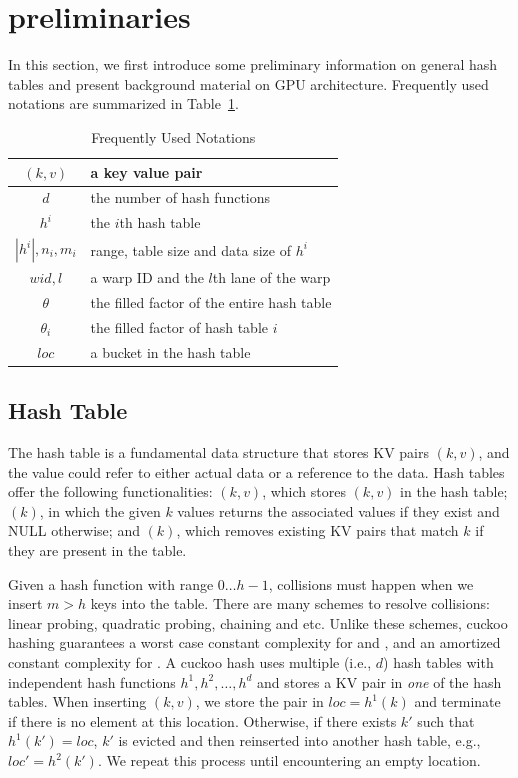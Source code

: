 \section{preliminaries}\label{sec:pre}
In this section, we first introduce some preliminary information on general hash tables and  present background material on GPU architecture. Frequently used notations are summarized in Table~\ref{tbl:stat:datasets}.

\begin{table}
	\centering
	\caption{Frequently Used Notations}
	\vspace{-1em}
	\label{tbl:stat:datasets}
	\begin{tabular}{|c|l|}
		\hline
		$(k,v)$ & a key value pair \\ \hline
		$d$		& the number of hash functions \\ \hline
		$h^i$	& the $i$th hash table \\ \hline
		$|h^i|,n_i,m_i$	& range, table size and data size of $h^i$ \\ \hline
		$wid,l$	& a warp ID and the $l$th lane of the warp \\ \hline
		$\theta$& the filled factor of the entire hash table \\ \hline
		$\theta_i$& the filled factor of hash table $i$ \\ \hline
		$loc$	& a bucket in the hash table \\ \hline
	\end{tabular}
\end{table}

\subsection{Hash Table}
The hash table is a fundamental data structure that stores KV pairs $(k,v)$, and the value could refer to either actual data or a reference to the data.
Hash tables offer the following functionalities: $(k,v)$, which stores $(k,v)$ in the hash table; $(k)$, in which the given $k$ values returns the associated values if they exist and NULL otherwise; and $(k)$, which removes existing KV pairs that match $k$ if they are present in the table.

Given a hash function with range $0 \ldots h-1$, collisions must happen when we insert $m>h$ keys into the table. There are many schemes to resolve collisions: linear probing, quadratic probing, chaining and etc. Unlike these schemes, cuckoo hashing \cite{pagh2004cuckoo} guarantees a worst case constant complexity for  and ,  and an amortized constant complexity for . A cuckoo hash uses multiple (i.e., $d$) hash tables with independent hash functions $h^1,h^2,\ldots,h^d$ and stores a KV pair in \emph{one} of the hash tables. When inserting $(k,v)$, we store the pair in $loc=h^1(k)$ and terminate if there is no element at this location. Otherwise, if there exists $k'$ such that $h^1(k')=loc$, $k'$ is evicted and then reinserted into another hash table, e.g., $loc'=h^2(k')$.
We repeat this process until encountering an empty location.

